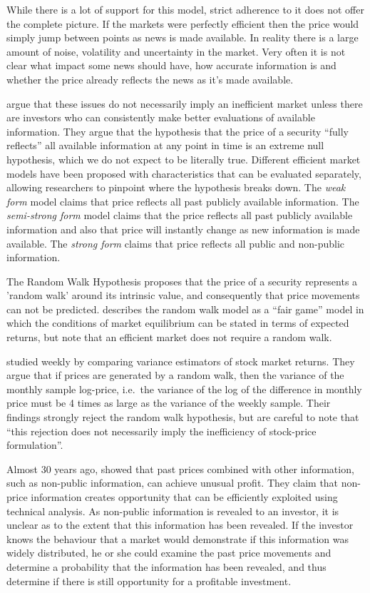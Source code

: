 \documentclass[12pt]{article}
\theoremstyle{definition}
\begin{document}
While there is a lot of support for this model, strict adherence to it does not offer the complete picture. If the markets were perfectly efficient then the price would simply jump between points as news is made available. In reality there is a large amount of noise, volatility and uncertainty in the market. Very often it is not clear what impact some news should have, how accurate information is and whether the price already reflects the news as it's made available.

\cite{malkiel1970efficient} argue that these issues do not necessarily imply an inefficient market unless there are investors who can consistently make better evaluations of available information. They argue that the hypothesis that the price of a security ``fully reflects'' all available information at any point in time is an extreme null hypothesis, which we do not expect to be literally true. Different efficient market models have been proposed with characteristics that can be evaluated separately, allowing researchers to pinpoint where the hypothesis breaks down. The \textit{weak form} model claims that price reflects all past publicly available information. The \textit{semi-strong form} model claims that the price reflects all past publicly available information and also that price will instantly change as new information is made available. The \textit{strong form} claims that price reflects all public and non-public information.

The Random Walk Hypothesis proposes that the price of a security represents a 'random walk' around its intrinsic value, and consequently that price movements can not be predicted. \cite{malkiel1970efficient} describes the random walk model as a ``fair game'' model in which the conditions of market equilibrium can be stated in terms of expected returns, but note that an efficient market does not require a random walk. 

\cite{lo1988} studied weekly by comparing variance estimators of stock market returns. They argue that if prices are generated by a random walk, then the variance of the monthly sample log-price, i.e.\ the variance of the log of the difference in monthly price must be 4 times as large as the variance of the weekly sample. Their findings strongly reject the random walk hypothesis, but are careful to note that ``this rejection does not necessarily imply the inefficiency of stock-price formulation''.

Almost 30 years ago, \cite{indefenseof} showed that past prices combined with other information, such as non-public information, can achieve unusual profit. They claim that non-price information creates opportunity that can be efficiently exploited using technical analysis. As non-public information is revealed to an investor, it is unclear as to the extent that this information has been revealed. If the investor knows the behaviour that a market would demonstrate if this information was widely distributed, he or she could examine the past price movements and determine a probability that the information has been revealed, and thus determine if there is still opportunity for a profitable investment.
\end{document}
